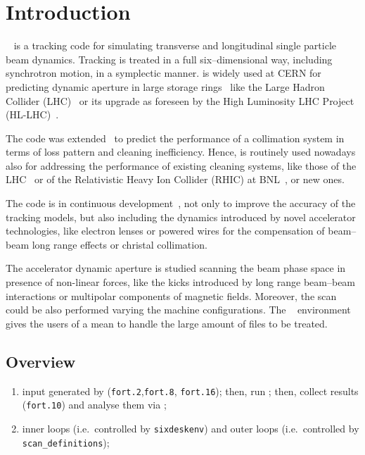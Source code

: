 \chapter{Introduction} \label{Intro}
\SIXTRACK{}~\cite{SixTrack_user_manual,SixPub,sixtrackWeb} is a tracking
code for simulating transverse and longitudinal single particle beam dynamics.
Tracking is treated in a full six--dimensional way, including synchrotron
motion, in a symplectic manner. \SIXTRACK{} is widely used at CERN for
predicting dynamic aperture in large storage
rings~\cite{DynApeStudiesGiovannozzi2015} like the Large Hadron Collider
(LHC)~\cite{NomLHCdesignRepoV1} or its upgrade as foreseen by the
High Luminosity LHC Project (HL-LHC)~\cite{HLLHC_book,HLLHCtechDesRepo}.

The code was extended~\cite{SixTrackForCollimation} to predict the
performance of a collimation system in terms of loss pattern and cleaning
inefficiency. Hence, \SIXTRACK{} is routinely used nowadays also
for addressing the performance of existing cleaning systems,
like those of the LHC~\cite{LHCCollSys} or of the Relativistic
Heavy Ion Collider (RHIC) at BNL~\cite{RHICcollSys}, or new ones.

The code is in continuous development~\cite{HLLHCTrackWS,Amereghe6TColl},
not only to improve the accuracy of the tracking models, but also including
the dynamics introduced by novel accelerator technologies, like electron
lenses or powered wires for the compensation of beam--beam long range effects
or christal collimation.

The accelerator dynamic aperture is studied scanning
the beam phase space in presence of non-linear forces, like the kicks
introduced by long range beam--beam interactions or multipolar components
of magnetic fields. Moreover, the scan could be also performed varying
the machine configurations. The
\SIXDESK{}~\cite{SixDesk_original,SixDesk_updated} environment gives the
users of \SIXTRACK{} a mean to handle the large amount of files to be treated.

\section{Overview}
\begin{enumerate}
\item \SIXTRACK{} input generated by \MADX{} (\texttt{fort.2},\texttt{fort.8},
  \texttt{fort.16}); then, run \SIXTRACK{}; then, collect results
  (\texttt{fort.10}) and analyse them via \SIXDB{};
\item inner loops (i.e.~controlled by \texttt{sixdeskenv}) and outer loops
  (i.e.~controlled by \texttt{scan\_definitions});
\end{enumerate}

